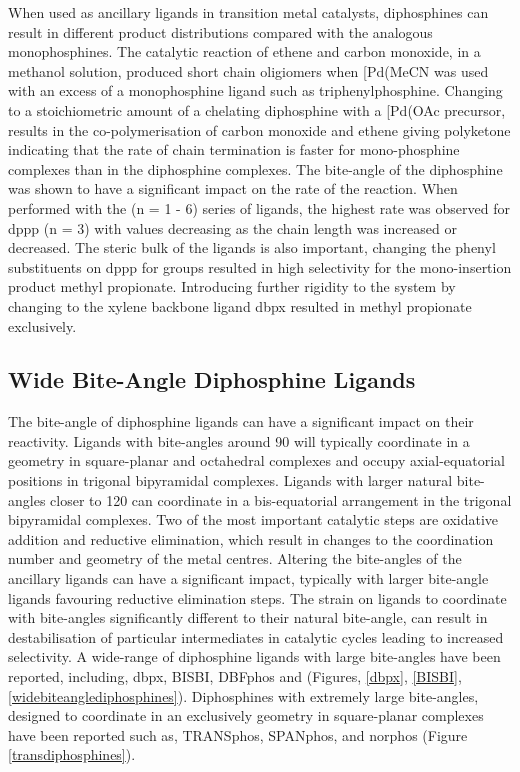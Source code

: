 When used as ancillary ligands in transition metal catalysts, diphosphines can result in different product distributions compared with the analogous monophosphines.  The catalytic reaction of ethene and carbon monoxide, in a methanol solution, produced short chain oligiomers when [Pd(MeCN\ce{)4](BF4)2} was used with an excess of a monophosphine ligand such as triphenylphosphine.\cite{Lai1984}  Changing to a stoichiometric amount of a chelating diphosphine with a [Pd(OAc\ce{)2]} precursor, results in the co-polymerisation of carbon monoxide and ethene giving polyketone indicating that the rate of chain termination is faster for mono-phosphine complexes than in the diphosphine complexes.\cite{Drent1991}  The bite-angle of the diphosphine was shown to have a significant impact on the rate of the reaction.  When performed with the  (n = 1 - 6) series of ligands, the highest rate was observed for \gls{dppp} (n = 3) with values decreasing as the chain length was increased or decreased.\cite{Drent1991}  The steric bulk of the ligands is also important, changing the phenyl substituents on \acrshort{dppp} for \tBu{} groups resulted in high selectivity for the mono-insertion product methyl propionate.  Introducing further rigidity to the system by changing to the xylene backbone ligand \gls{dbpx} resulted in methyl propionate exclusively.\cite{Eastham2000}

\subsection{Wide Bite-Angle Diphosphine Ligands}

The bite-angle of diphosphine ligands can have a significant impact on their reactivity.  Ligands with bite-angles around 90\degrees{} will typically coordinate in a \cis{} geometry in square-planar and octahedral complexes and occupy axial-equatorial positions in trigonal bipyramidal complexes.  Ligands with larger natural bite-angles closer to 120\degrees{} can coordinate in a bis-equatorial arrangement in the trigonal bipyramidal complexes.\cite{Kranenburg1995}  Two of the most important catalytic steps are oxidative addition and reductive elimination, which result in changes to the coordination number and geometry of the metal centres.\cite{Tsuji1995}  Altering the bite-angles of the ancillary ligands can have a significant impact, typically with larger bite-angle ligands favouring reductive elimination steps.\cite{Freixa2003}  The strain on ligands to coordinate with bite-angles significantly different to their natural bite-angle, can result in destabilisation of particular intermediates in catalytic cycles leading to increased selectivity.\cite{Freixa2003}  A wide-range of diphosphine ligands with large bite-angles have been reported, including, dbpx, BISBI, DBFphos and \Phxantphos{} (Figures, \ref{dbpx}, \ref{BISBI}, \ref{widebiteanglediphosphines}).  Diphosphines with extremely large bite-angles, designed to coordinate in an exclusively \trans{} geometry in square-planar complexes have been reported such as, TRANSphos, SPANphos, and norphos (Figure \ref{transdiphosphines})\cite{Freixa2003b, Kamer2001, Dierkes1999}.

